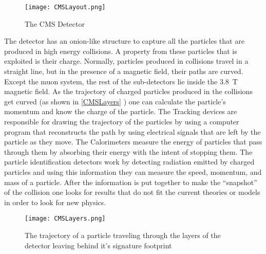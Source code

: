 



\begin{figure}
	\texttt{[image: CMSLayout.png]}
	\caption{The CMS Detector \label{CMSLayout}}
\end{figure}

The detector has an onion-like structure to capture all the particles that are produced in high energy collisions.
A property from these particles that is exploited is their charge. Normally, particles produced in collisions travel in a straight line, but in the presence of a magnetic field, their paths are curved.
Except the muon system, the rest of the sub-detectors lie inside the 3.8~T magnetic field. As the trajectory of charged particles produced in the collisions get curved (as shown in \autoref{CMSLayers} ) one can calculate the particle's momentum and know the charge of the particle.
The Tracking devices are responsible for drawing the trajectory of the particles by using a computer program that reconstructs the path by using electrical signals that are left by the particle as they move.
The Calorimeters measure the energy of particles that pass through them by absorbing their energy with the intent of stopping them. The particle identification detectors work by detecting radiation emitted by charged particles and using this information they can measure the speed, momentum, and mass of a particle. After the information is put together to make the “snapshot” of the collision one looks for results that do not fit the current theories or models in order to look for new physics. \cite{CMS_detector}


\begin{figure}
	\texttt{[image: CMSLayers.png]}
	\caption{The trajectory of a particle traveling through the layers of the detector leaving behind it's signature footprint\label{CMSLayers}}
\end{figure}


